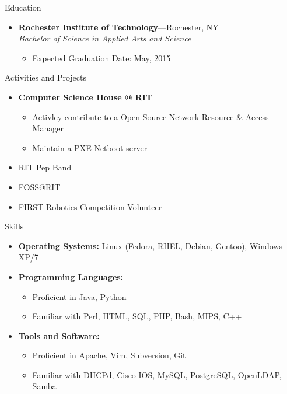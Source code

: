 \documentclass[10pt,oneside]{article}
\newenvironment{ressection}[1]{
	\vspace{3pt}
	{\fontfamily{ppl}\selectfont\Large#1}
	\begin{itemize}
	\vspace{2pt}
}{
	\end{itemize}
}
\newcommand{\resitem}[1]{
	\vspace{-2pt}
	\item \begin{flushleft} #1 \end{flushleft}
}
\newcommand{\ressubitem}[1]{
	\vspace{-1pt}
	\item \begin{flushleft} #1 \end{flushleft}
}
\newcommand{\resbigitem}[3]{
	\vspace{-3pt}
	\item
	\textbf{#1}---#2 \\
	\textit{#3}
}
\newenvironment{ressubsec}[3]{
	\resbigitem{#1}{#2}{#3}
	\vspace{-1pt}
	\begin{itemize}
}{
	\end{itemize}
}
\newenvironment{reslist}[1]{
	\resitem{\textbf{#1}}
	\vspace{-3pt}
	\begin{itemize}
}{
	\end{itemize}
}
\begin{document}
\begin{ressection}{Education}

	\begin{ressubsec}{Rochester Institute of Technology}{Rochester, NY}{Bachelor of Science in Applied Arts and Science}
		\ressubitem{Expected Graduation Date: May, 2015}
	\end{ressubsec}

\end{ressection}

\begin{ressection}{Activities and Projects}
	\begin{reslist}{Computer Science House @ RIT}
		\ressubitem{Activley contribute to a Open Source Network Resource \& Access Manager}
		\ressubitem{Maintain a PXE Netboot server}
	\end{reslist}
	\resitem{RIT Pep Band}
	\resitem{FOSS@RIT}
	\resitem{FIRST Robotics Competition Volunteer}
\end{ressection}
\begin{ressection}{Skills}

	\resitem{\textbf{Operating Systems:} Linux (Fedora, RHEL, Debian, Gentoo), Windows XP/7}

	\begin{reslist}{Programming Languages:}
		\ressubitem{Proficient in Java, Python}
		\ressubitem{Familiar with Perl, HTML, SQL, PHP, Bash, MIPS, C++}
	\end{reslist}

	\begin{reslist}{Tools and Software:}
		\ressubitem{Proficient in Apache, Vim, Subversion, Git}
		\ressubitem{Familiar with DHCPd, Cisco IOS, MySQL, PostgreSQL, OpenLDAP, Samba}
	\end{reslist}

\end{ressection}

\end{document}
